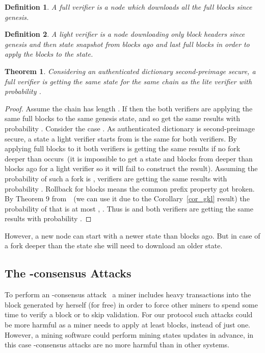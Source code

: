 \documentclass[conference,compsoc]{IEEEtran}
\newtheorem{theorem}{Theorem}
\newtheorem{definition}{Definition}
\begin{document}
\begin{definition}A full verifier is a node which downloads all the full blocks since genesis. \end{definition}

\begin{definition}A light verifier is a node downloading only block headers since genesis and then state snapshot from  blocks ago and last  full blocks in order to apply the blocks to the state. \end{definition}


\begin{theorem}
Considering an authenticated dictionary second-preimage secure, a full verifier is getting the same state for the same chain as the lite verifier with probability .
\end{theorem}
\begin{proof}
Assume the chain has length . If  then the both verifiers are applying the same full blocks to the same genesis state, and so get the same results with probability . Consider the case . As authenticated dictionary is second-preimage secure, a state a light verifier starts from is the same for both verifiers. By applying  full blocks to it both verifiers is getting the same results if no fork deeper than  occurs~(it is impossible to get a state and blocks from deeper than  blocks ago for a light verifier so it will fail to construct the result). Assuming the probability of such a fork is , verifiers are getting the same results with probability . 
Rollback for  blocks means the common prefix property got broken. By Theorem 9 from~\cite{garay2015bitcoin}~(we can use it due to the Corollary~\ref{cor_gkl} result) the probability of that is at most , . Thus  is  and both verifiers are getting the same results with probability .
\end{proof}


However, a new node can start with a newer state than  blocks ago. But in case of a fork deeper than the state she will need to download an older state.

\subsection{The -consensus Attacks}

To perform an -consensus attack~\cite{luu2015demystifying} a miner includes heavy transactions into the block generated by herself (for free) in order to force other miners to spend some time to verify a block or to skip validation. For our protocol such attacks could be more harmful as a miner needs to apply at least  blocks, instead of just one. However, a mining software could perform mining states updates in advance, in this case -consensus attacks are no more harmful than in other systems. 
\end{document}

